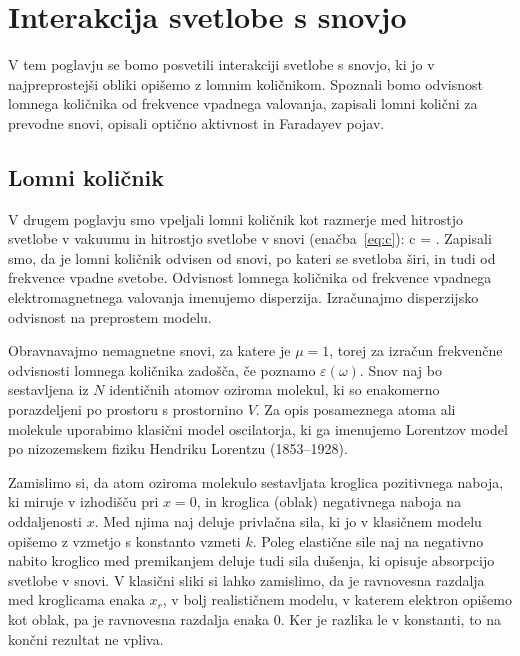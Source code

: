 
\chapter{Interakcija svetlobe s snovjo}
V tem poglavju se bomo posvetili interakciji svetlobe s snovjo, ki jo 
v najpreprostejši obliki opišemo z lomnim količnikom. Spoznali bomo 
odvisnost lomnega količnika od frekvence vpadnega valovanja, zapisali
lomni količni za prevodne snovi, opisali optično aktivnost in Faradayev 
pojav.
 
\section{Lomni količnik}
V drugem poglavju smo vpeljali lomni količnik kot razmerje med hitrostjo
svetlobe v vakuumu in hitrostjo svetlobe v snovi (enačba~\ref{eq:c}):
\beq
c = .
\label{eq:09_01}
\eeq
Zapisali smo, da je lomni količnik odvisen od snovi, po kateri se svetloba širi, 
in tudi od frekvence vpadne svetobe. Odvisnost lomnega količnika od
frekvence vpadnega elektromagnetnega valovanja imenujemo disperzija. 
Izračunajmo disperzijsko odvisnost na preprostem modelu. 

Obravnavajmo nemagnetne snovi, za katere je $\mu = 1$, torej 
za izračun frekvenčne odvisnosti lomnega količnika zadošča, če 
poznamo $\varepsilon(\omega)$. Snov naj bo sestavljena iz $N$
identičnih atomov oziroma molekul, ki so enakomerno porazdeljeni
po prostoru s prostornino $V$. Za opis posameznega atoma ali molekule uporabimo 
klasični model oscilatorja, ki ga imenujemo Lorentzov model 
po nizozemskem fiziku Hendriku Lorentzu (1853--1928). 

Zamislimo si, da atom oziroma molekulo sestavljata kroglica 
pozitivnega naboja, ki miruje v izhodišču pri $x=0$, in kroglica
(oblak) negativnega naboja na oddaljenosti $x$. Med njima naj 
deluje privlačna sila, ki jo v klasičnem modelu opišemo z vzmetjo
s konstanto vzmeti $k$. 
Poleg elastične sile naj na negativno nabito kroglico med 
premikanjem deluje tudi sila dušenja, ki opisuje absorpcijo svetlobe
v snovi. V klasični sliki si lahko
zamislimo, da je ravnovesna razdalja med kroglicama enaka $x_r$, 
v bolj realističnem modelu, v katerem elektron opišemo kot oblak, 
pa je ravnovesna razdalja enaka 0. Ker je razlika le v konstanti, 
to na končni rezultat ne vpliva.

